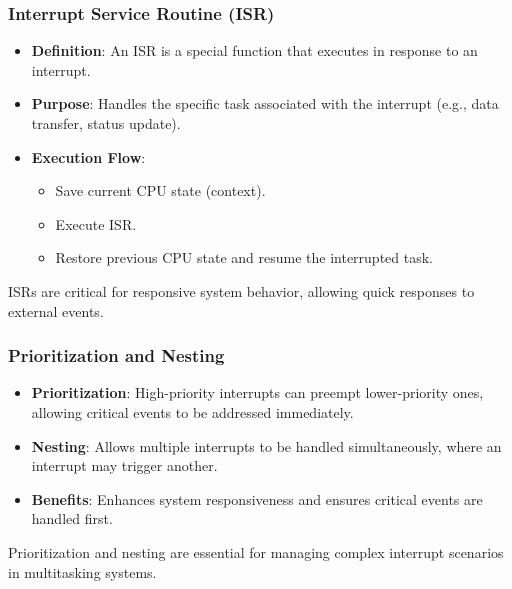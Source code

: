 \begin{frame}
    \frametitle{Interrupt Service Routine (ISR)}

    \begin{itemize}
        \item \textbf{Definition}: An ISR is a special function that executes in response to an interrupt.
        \item \textbf{Purpose}: Handles the specific task associated with the interrupt (e.g., data transfer, status update).
        \item \textbf{Execution Flow}:
            \begin{itemize}
                \item Save current CPU state (context).
                \item Execute ISR.
                \item Restore previous CPU state and resume the interrupted task.
            \end{itemize}
    \end{itemize}

    \bigskip
    ISRs are critical for responsive system behavior, allowing quick responses to external events.
\end{frame}

\begin{frame}
    \frametitle{Prioritization and Nesting}

    \begin{itemize}
        \item \textbf{Prioritization}: High-priority interrupts can preempt lower-priority ones, allowing critical events to be addressed immediately.
        \item \textbf{Nesting}: Allows multiple interrupts to be handled simultaneously, where an interrupt may trigger another.
        \item \textbf{Benefits}: Enhances system responsiveness and ensures critical events are handled first.
    \end{itemize}

    \bigskip
    Prioritization and nesting are essential for managing complex interrupt scenarios in multitasking systems.
\end{frame}

